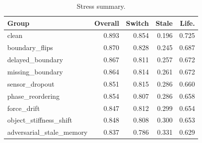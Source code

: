 \begin{table}[t]
\centering
\caption{Stress summary.}
\label{tab:stress-summary}
\small
\begin{tabular}{lrrrr}
\toprule
Group & Overall & Switch & Stale & Life. \\
\midrule
clean & 0.893 & 0.854 & 0.196 & 0.725 \\
boundary\_flips & 0.870 & 0.828 & 0.245 & 0.687 \\
delayed\_boundary & 0.867 & 0.811 & 0.257 & 0.672 \\
missing\_boundary & 0.864 & 0.814 & 0.261 & 0.672 \\
sensor\_dropout & 0.851 & 0.815 & 0.286 & 0.660 \\
phase\_reordering & 0.854 & 0.807 & 0.286 & 0.658 \\
force\_drift & 0.847 & 0.812 & 0.299 & 0.654 \\
object\_stiffness\_shift & 0.848 & 0.808 & 0.300 & 0.653 \\
adversarial\_stale\_memory & 0.837 & 0.786 & 0.331 & 0.629 \\
\bottomrule
\end{tabular}
\end{table}
